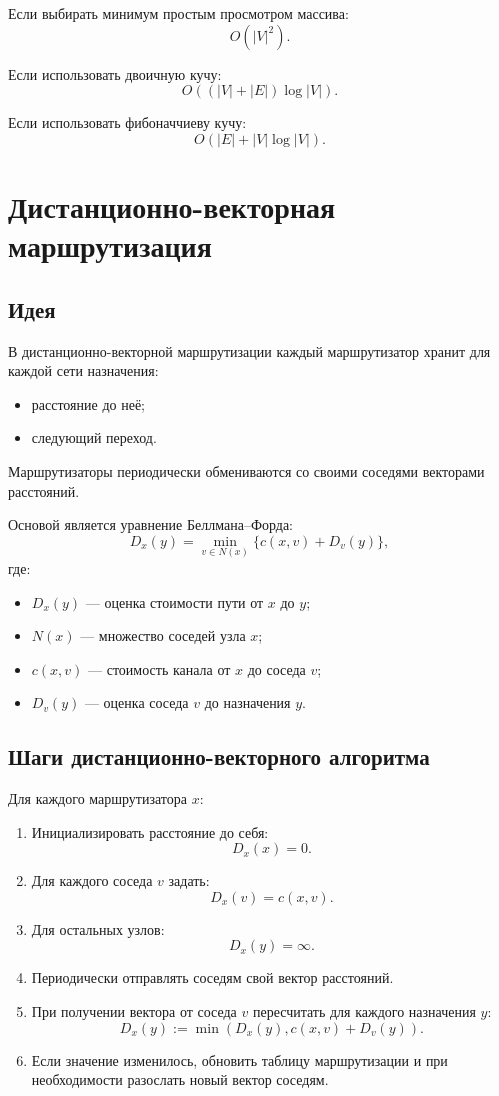 \documentclass[12pt,a4paper]{article}
\begin{document}
Если выбирать минимум простым просмотром массива:
\[
O(|V|^2).
\]

Если использовать двоичную кучу:
\[
O((|V|+|E|)\log |V|).
\]

Если использовать фибоначчиеву кучу:
\[
O(|E| + |V|\log |V|).
\]

\section{Дистанционно-векторная маршрутизация}

\subsection{Идея}

В дистанционно-векторной маршрутизации каждый маршрутизатор хранит для каждой сети назначения:
\begin{itemize}
    \item расстояние до неё;
    \item следующий переход.
\end{itemize}

Маршрутизаторы периодически обмениваются со своими соседями векторами расстояний.

Основой является уравнение Беллмана--Форда:
\[
D_x(y) = \min_{v \in N(x)} \{ c(x,v) + D_v(y) \},
\]
где:
\begin{itemize}
    \item $D_x(y)$ --- оценка стоимости пути от $x$ до $y$;
    \item $N(x)$ --- множество соседей узла $x$;
    \item $c(x,v)$ --- стоимость канала от $x$ до соседа $v$;
    \item $D_v(y)$ --- оценка соседа $v$ до назначения $y$.
\end{itemize}

\subsection{Шаги дистанционно-векторного алгоритма}

Для каждого маршрутизатора $x$:

\begin{enumerate}
    \item Инициализировать расстояние до себя:
    \[
    D_x(x)=0.
    \]
    \item Для каждого соседа $v$ задать:
    \[
    D_x(v)=c(x,v).
    \]
    \item Для остальных узлов:
    \[
    D_x(y)=\infty.
    \]
    \item Периодически отправлять соседям свой вектор расстояний.
    \item При получении вектора от соседа $v$ пересчитать для каждого назначения $y$:
    \[
    D_x(y) := \min(D_x(y), c(x,v)+D_v(y)).
    \]
    \item Если значение изменилось, обновить таблицу маршрутизации и при необходимости разослать новый вектор соседям.
\end{enumerate}
\end{document}
